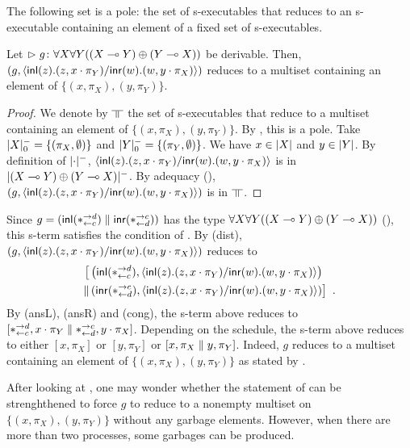 \begin{proposition}
 \label{prop:exec-on-pole}
 The following set is a pole: the set of s-executables that reduces to
 an s-executable containing an element of a fixed set of s-executables.
\end{proposition}

\begin{proposition}
 \label{spec:prelin}
 Let $\vartriangleright{g} \colon{\forall X\forall Y((X\multimap Y)\oplus (Y\multimap X))}$ be
 derivable.
 Then, $\left(g, \langle \mathsf{inl}({z}). ({z},{x\cdot\pi_Y})/ \mathsf{inr}({w}). ({w},{y\cdot\pi_X})\rangle\right)$
 reduces to a multiset containing an element of
 $\{(x,\pi_X), (y,\pi_Y)\}$.
\end{proposition}
\begin{proof}
 We denote by $\bbot$ the set of s-executables that reduce to a multiset
 containing an element of $\{(x,\pi_X), (y,\pi_Y)\}$.
 By , this is a pole.
 Take $|{X}|^-_0 = \{(\pi_X,\emptyset)\}$ and
      $|{Y}|^-_0 = \{(\pi_Y,\emptyset)\}$.
 We have $x\in|{X}|$ and $y\in|{Y}|$.
 By definition of $|{\cdot}|^-$,
 $\langle \mathsf{inl}({z}). ({z},{x\cdot\pi_Y})/ \mathsf{inr}({w}). ({w},{y\cdot\pi_X})\rangle$ is in $|{(X\multimap
 Y)\oplus (Y\multimap X)}|^-$.
 By adequacy (), $\left(g,
 \langle \mathsf{inl}({z}). ({z},{x\cdot\pi_Y})/ \mathsf{inr}({w}). ({w},{y\cdot\pi_X})\rangle\right)$ is in $\bbot$.
\end{proof}

\begin{example}
 \label{spec-ex}
 Since $g = (\mathsf{inl}({\ast^{\rightarrow {d}}_{\leftarrow{c}}})\parallel\mathsf{inr}({\ast^{\rightarrow {c}}_{\leftarrow{d}}}))$ has the type
 $\forall X\forall Y((X\multimap Y)\oplus (Y\multimap X))$ (),
 this s-term satisfies the condition of .
 By (dist),
 $\left(g, \langle \mathsf{inl}({z}). ({z},{x\cdot\pi_Y})/ \mathsf{inr}({w}). ({w},{y\cdot\pi_X})\rangle\right)$
 reduces to
 \begin{align*}
  \bigl[& \left(\mathsf{inl}({\ast^{\rightarrow {d}}_{\leftarrow{c}}}),
  \langle \mathsf{inl}({z}). ({z},{x\cdot\pi_Y})/ \mathsf{inr}({w}). ({w},{y\cdot\pi_X})\rangle\right) \\ \parallel
  & \left(\mathsf{inr}({\ast^{\rightarrow {c}}_{\leftarrow{d}}}), \langle \mathsf{inl}({z}). ({z},{x\cdot\pi_Y})/ \mathsf{inr}({w}). ({w},{y\cdot\pi_X})\rangle\right)\bigr]\enspace.
 \end{align*}
 By (ansL), (ansR) and (cong), the s-term above reduces to
 $[\ast^{\rightarrow {d}}_{\leftarrow{c}}, x\cdot\pi_Y\parallel \ast^{\rightarrow {c}}_{\leftarrow{d}},y\cdot\pi_X]$.
 Depending on the schedule,  the s-term above reduces to either
 $[x,\pi_X]$ or $[y,\pi_Y]$ or $[x,\pi_X\parallel y,\pi_Y]$.
 Indeed, $g$ reduces to a multiset containing an element of
 $\{(x,\pi_X), (y,\pi_Y)\}$ as stated by .
\end{example}

After looking at ,
one may wonder whether the statement of  can be
strenghthened to force $g$ to reduce to a nonempty multiset on
$\{(x,\pi_X), (y,\pi_Y)\}$ without any garbage elements.
However, when there are more than two processes, some garbages can be
produced.

